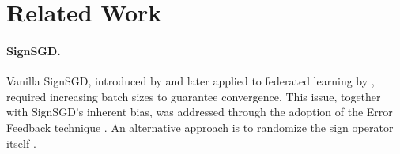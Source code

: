 \documentclass{article}
\begin{document}

\section{Related Work}\label{sec:relWork}
\paragraph{SignSGD.} Vanilla SignSGD, introduced by \citet{bernstein2018signsgd} and later applied to federated learning by \citet{bernstein2019signsgdmajority}, required increasing batch sizes to guarantee convergence. This issue, together with SignSGD's inherent bias, was addressed through the adoption of the Error Feedback technique \citep{karimireddy2019efsign}. An alternative approach is to randomize the sign operator itself \citep{chen2020median,safaryan2021ssdm,jin2024stosign}.
\end{document}
